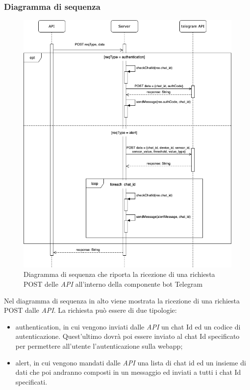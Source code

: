 \subsubsection{Diagramma di sequenza}%
	\begin{figure}[H]
		\centering
		\includegraphics[scale=0.600]{res/images/BOTTELEGRAM/TelegramRichiestaPOST.png}
		\caption{Diagramma di sequenza che riporta la ricezione di una richiesta POST delle \textit{API} all'interno della componente bot Telegram}
		\label{Diagramma 20}
	\end{figure}

	Nel diagramma di sequenza in alto viene mostrata la ricezione di una richiesta POST dalle \textit{API}. La richiesta può essere di due tipologie: 
	\begin{itemize}
		\item authentication, in cui vengono inviati dalle \textit{API} un chat Id ed un codice di autenticazione. Quest'ultimo dovrà poi essere inviato al chat Id specificato per permettere all'utente l'autenticazione sulla webapp;
		\item alert, in cui vengono mandati dalle \textit{API} una lista di chat id ed un insieme di dati che poi andranno composti in un messaggio ed inviati a tutti i chat Id specificati.
	\end{itemize}

